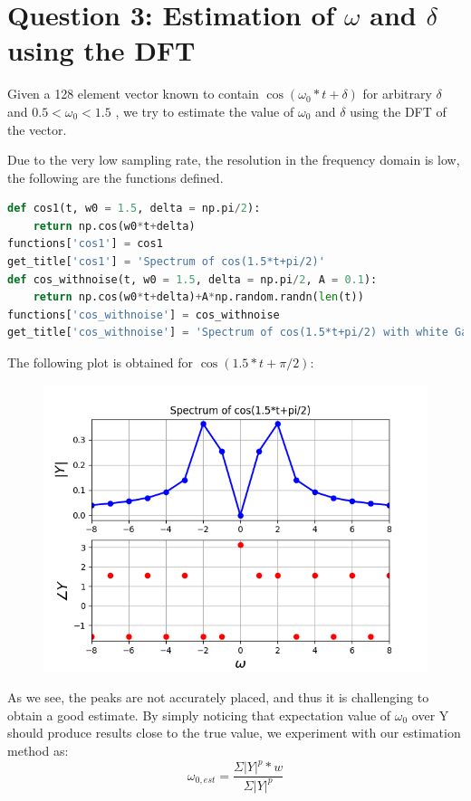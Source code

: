 \documentclass[11pt, a4paper]{article}
\begin{document}
\section{Question 3: Estimation of $\omega$ and $\delta$ using the DFT}
Given a 128 element vector known to contain $\cos(\omega_0*t+\delta)$ for arbitrary $\delta$ and $0.5 < \omega_0 < 1.5$ , we try to estimate the value of $\omega_0$ and $\delta$ using the DFT of the vector.

Due to the very low sampling rate, the resolution in the frequency domain is low, the following are the functions defined.

\begin{lstlisting}[language = Python]
def cos1(t, w0 = 1.5, delta = np.pi/2):
    return np.cos(w0*t+delta)
functions['cos1'] = cos1
get_title['cos1'] = 'Spectrum of cos(1.5*t+pi/2)'
def cos_withnoise(t, w0 = 1.5, delta = np.pi/2, A = 0.1):
    return np.cos(w0*t+delta)+A*np.random.randn(len(t))
functions['cos_withnoise'] = cos_withnoise
get_title['cos_withnoise'] = 'Spectrum of cos(1.5*t+pi/2) with white Gaussian noise'
\end{lstlisting}

The following plot is obtained for $\cos(1.5*t+\pi/2)$:
\begin{figure}[H]
     \centering
     \includegraphics[scale=0.8]{Figure_6.png}
\end{figure}

As we see, the peaks are not accurately placed, and thus it is challenging to obtain a good estimate. By simply noticing that expectation value of $\omega_0$ over Y should produce results close to the true value, we experiment with our estimation method as:
\[\omega_{0,est} = \frac{\Sigma |Y|^p*w}{\Sigma|Y|^p}\]
\end{document}
